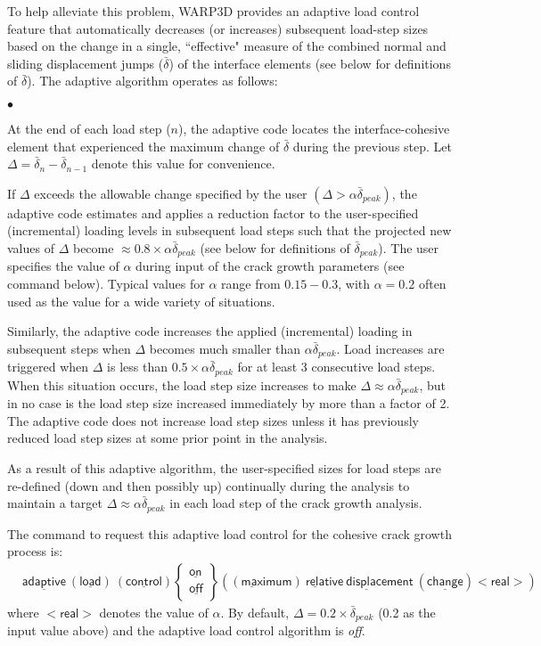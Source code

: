 \documentclass[11pt]{report}
\numberwithin{equation}{section}
\newcommand{\ul} {\underline}
\newcommand{\hv} {\mathsf}   %
\newcommand{\ti}{\emph}
\newcommand{\squishlist}{
 \begin{list}{$\bullet$}
  { \setlength{\itemsep}{0pt}
     \setlength{\parsep}{3pt}
     \setlength{\topsep}{3pt}
     \setlength{\partopsep}{0pt}
     \setlength{\leftmargin}{1.5em}
     \setlength{\labelwidth}{1em}
     \setlength{\labelsep}{0.5em} } }
\newcommand{\squishend}{
  \end{list}  }
\begin{document}
To help alleviate this problem, WARP3D provides an adaptive load
control feature that automatically decreases (or increases) subsequent load-step
sizes based on the change in a single, ``effective" measure of the combined
normal and sliding displacement jumps ($\bar\delta$) 
of the interface elements (see
below for definitions of $\bar\delta$). The adaptive
algorithm operates as follows:
%
\small
\squishlist

\item At the end of each load step ($n$), the adaptive code locates the
interface-cohesive element that experienced the maximum change of
$\bar\delta$ during the previous step. Let $\Delta= \bar\delta_n
-\bar\delta_{n-1}$
denote this value for convenience. 

\item If $\Delta$ exceeds the allowable change specified by the user
$(\Delta> \alpha \bar\delta_{peak})$, the adaptive code estimates 
and applies a reduction factor to the user-specified (incremental)
loading levels in subsequent load steps such that the projected 
new values of $\Delta$ become $\approx 0.8 \times \alpha \bar\delta_{peak}$ (see below
for definitions of $\bar\delta_{peak}$). The user 
specifies the value of $\alpha$
during input of the crack growth parameters (see command below). 
Typical values for $\alpha$ range from $0.15-0.3$, with 
$\alpha=0.2$ often used as the value for a wide variety of situations. 

\item Similarly, the adaptive code increases the applied 
(incremental) loading in subsequent steps when 
$\Delta$ becomes much smaller than 
$\alpha \bar\delta_{peak}$. Load increases are triggered when 
$\Delta$ is less than $0.5 \times \alpha \bar\delta_{peak}$
for at least 3 consecutive load steps. When this situation occurs, the load
step size increases to make $\Delta \approx \alpha \bar\delta_{peak}$, 
but in no case is the load step size increased immediately by more than a factor of 2.
The adaptive code does not increase load step sizes unless it has
previously reduced load step sizes at some prior point in the analysis.
\squishend
\normalsize
%
As a result of this adaptive algorithm, the user-specified sizes for load steps
are re-defined (down and then possibly up) continually during the analysis 
to maintain a target 
$\Delta \approx \alpha \bar\delta_{peak}$ in each load step of the crack growth analysis.

The command to request this adaptive load control for the cohesive crack growth
process is:
\begin{align*}
&\hv{\ul{adaptive}\ (\ul{load}) \ (\ul{control})}
\begin{Bmatrix}
\hv{\ul{on}} \\ \hv{\ul{off}}\end{Bmatrix}
\left(\hv{(\ul{max}imum)\ \ul{rela}tive\ \ul{displace}ment\ (\ul{change}) <real>}\right)
\end{align*}
where $\hv{<real>}$ denotes the value of $\alpha$. By default, 
$\Delta=0.2 \times \bar\delta_{peak}$ (0.2 as the input value above) 
and the adaptive load control algorithm is \ti{off}.
\end{document}
